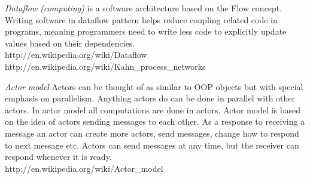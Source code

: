 \textit{Dataflow (computing)} is a software architecture based on the Flow concept. Writing software in dataflow pattern helps reduce coupling related code in programs, meaning programmers need to write less code to explicitly update values based on their dependencies.\\http://en.wikipedia.org/wiki/Dataflow\\http://en.wikipedia.org/wiki/Kahn\_process\_networks

\textit{Actor model} Actors can be thought of as similar to OOP objects but with special emphasis on parallelism. Anything actors do can be done in parallel with other actors. In actor model all computations are done in actors. Actor model is based on the idea of actors sending messages to each other. As a response to receiving a message an actor can create more actors, send messages, change how to respond to next message etc. Actors can send messages at any time, but the receiver can respond whenever it is ready.\\http://en.wikipedia.org/wiki/Actor\_model